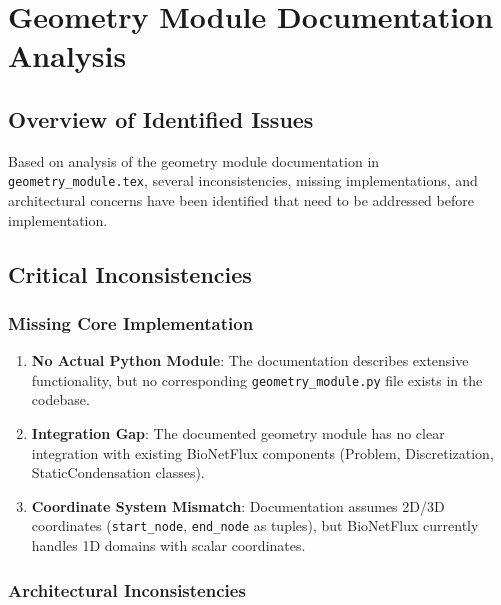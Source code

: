 %

\section{Geometry Module Documentation Analysis}

\subsection{Overview of Identified Issues}

Based on analysis of the geometry module documentation in \texttt{geometry\_module.tex}, several inconsistencies, missing implementations, and architectural concerns have been identified that need to be addressed before implementation.

\subsection{Critical Inconsistencies}

\subsubsection{Missing Core Implementation}

\begin{enumerate}
    \item \textbf{No Actual Python Module}: The documentation describes extensive functionality, but no corresponding \texttt{geometry\_module.py} file exists in the codebase.
    
    \item \textbf{Integration Gap}: The documented geometry module has no clear integration with existing BioNetFlux components (Problem, Discretization, StaticCondensation classes).
    
    \item \textbf{Coordinate System Mismatch}: Documentation assumes 2D/3D coordinates (\texttt{start\_node}, \texttt{end\_node} as tuples), but BioNetFlux currently handles 1D domains with scalar coordinates.
\end{enumerate}

\subsubsection{Architectural Inconsistencies}

